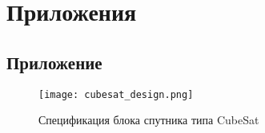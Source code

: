 \renewcommand{\chaptermark}[1]{\markboth{}{}}

\chapter*{Приложения}

\section{Приложение }
\label{subsec:attachement_cubesat_design}

\begin{sidewaysfigure}[htbp]
	\centering
	\texttt{[image: cubesat\_design.png]}
	\caption{Спецификация блока спутника типа CubeSat}
\end{sidewaysfigure}




